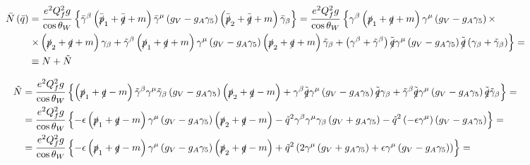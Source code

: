\begin{align*}
\bar{N} \left( \bar{q} \right) & = \frac{e^2Q_f^2g}{\cos\theta_W} \left\lbrace \bar{\gamma}^{\beta} \left( \bar{\slashed{p}}_1 + \bar{\slashed{q}} + m \right) \bar{\gamma}^{\mu} \left( g_V - g_A \gamma_5 \right) \left( \bar{\slashed{p}}_2 + \bar{\slashed{q}} + m \right) \bar{\gamma}_{\beta} \right\rbrace = \frac{e^2Q_f^2g}{\cos\theta_W} \left\lbrace \gamma^{\beta} \left( \slashed{p}_1 + \slashed{q} + m \right) \gamma^{\mu} \left( g_V - g_A \gamma_5 \right) \times \right. & \\
& \left. \times \left( \slashed{p}_2 + \slashed{q} + m \right) \gamma_{\beta} + \tilde{\gamma}^{\beta} \left( \slashed{p}_1 + \slashed{q} + m \right) \gamma^{\mu} \left( g_V - g_A \gamma_5 \right) \left( \slashed{p}_2 + \slashed{q} + m \right) \tilde{\gamma}_{\beta} + \left( \gamma^{\beta} + \tilde{\gamma}^{\beta} \right) \tilde{\slashed{q}} \gamma^{\mu} \left( g_V - g_A \gamma_5 \right) \tilde{\slashed{q}} \left( \gamma_{\beta} + \tilde{\gamma}_{\beta} \right) \right\rbrace = & \\
& \equiv N + \tilde{N} &
\end{align*}

\begin{align*}
\tilde{N} & = \frac{e^2Q_f^2g}{\cos\theta_W} \left\lbrace \left( \slashed{p}_1 + \slashed{q} - m \right) \tilde{\gamma}^{\beta} \gamma^{\mu} \tilde{\gamma}_{\beta} \left( g_V - g_A \gamma_5 \right) \left( \slashed{p}_2 + \slashed{q} - m \right) + \gamma^{\beta} \tilde{\slashed{q}} \gamma^{\mu} \left( g_V - g_A \gamma_5 \right) \tilde{\slashed{q}} \gamma_{\beta} + \tilde{\gamma}^{\beta} \tilde{\slashed{q}} \gamma^{\mu} \left( g_V - g_A \gamma_5 \right) \tilde{\slashed{q}} \tilde{\gamma}_{\beta}   \right\rbrace = & \\
& = \frac{e^2Q_f^2g}{\cos\theta_W} \left\lbrace -\epsilon \left( \slashed{p}_1 + \slashed{q} - m \right) \gamma^{\mu} \left( g_V - g_A \gamma_5 \right) \left( \slashed{p}_2 + \slashed{q} - m \right) - \tilde{q}^2 \gamma^{\beta}\gamma^{\mu}\gamma_{\beta} \left( g_V + g_A \gamma_5 \right) - \tilde{q}^2 \left( -\epsilon \gamma^{\mu} \right) \left( g_V - g_A \gamma_5 \right) \right\rbrace = & \\
& = \frac{e^2Q_f^2g}{\cos\theta_W} \left\lbrace -\epsilon \left( \slashed{p}_1 + \slashed{q} - m \right) \gamma^{\mu} \left( g_V - g_A \gamma_5 \right) \left( \slashed{p}_2 + \slashed{q} - m \right) + \tilde{q}^2 \left( 2 \gamma^{\mu} \left( g_V + g_A \gamma_5 \right) + \epsilon \gamma^{\mu} \left( g_V - g_A \gamma_5 \right) \right) \right\rbrace = &
\end{align*}

